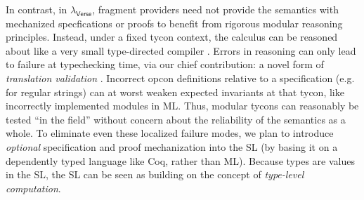 \documentclass[preprint]{sigplanconf}
\begin{document}
In contrast, in $\lambda_\textsf{Verse}$, fragment providers need not provide the semantics with mechanized specfications or proofs to benefit from rigorous modular reasoning principles. Instead, under a fixed tycon context, the calculus can be reasoned about like a very small type-directed compiler \cite{tarditi+:til-OLD,conf/pldi/Chlipala07,Dave:2003:CVB:966221.966235}. Errors in reasoning can only lead to failure at typechecking time, via our chief contribution: a novel form of \emph{translation validation} \cite{Pnueli-Siegel-Singerman98}. Incorrect opcon definitions relative to a specification (e.g. \cite{sanitation-psp14} for regular strings) can at worst weaken expected invariants at that tycon, like incorrectly implemented modules in ML. Thus, modular tycons can reasonably be tested ``in the field'' without concern about the reliability of the semantics as a whole. 
To eliminate even these localized failure modes, we plan to introduce \emph{optional} specification and proof mechanization into the SL (by basing it on a dependently typed language like Coq, rather than ML). Because types are values in the SL, the SL can be seen as building on the concept of \emph{type-level computation}. %
\end{document}
